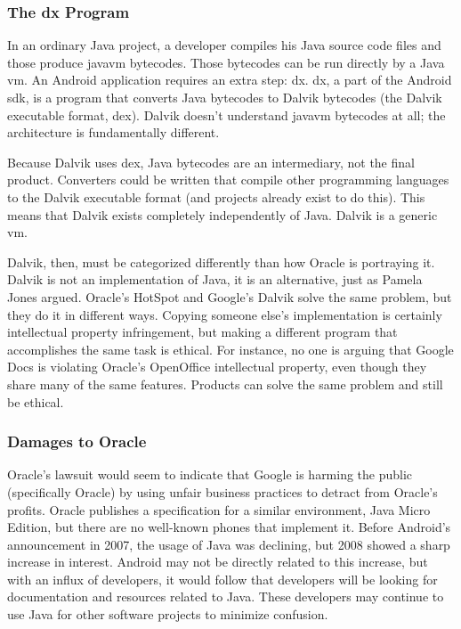 \documentclass[11pt]{article}
\begin{document}
\begin{multicols}{2}
\subsubsection{The dx Program} %
\label{ssub:dex}

In an ordinary Java project, a developer compiles his Java source code files and
those produce \gls{javavm} \glspl{bytecode}.  Those \glspl{bytecode} can be run
directly by a Java \gls{vm}.  An Android application requires an extra step: dx.
dx, a part of the Android \gls{sdk}, is a program that converts Java
\glspl{bytecode} to Dalvik \glspl{bytecode} (the Dalvik executable format, dex).
Dalvik doesn't understand \gls{javavm} \glspl{bytecode} at all; the architecture
is fundamentally different.

Because Dalvik uses dex, Java \glspl{bytecode} are an intermediary, not the
final product.  Converters could be written that compile other programming
languages to the Dalvik executable format (and projects already exist to do
this).  This means that Dalvik exists completely independently of Java.  Dalvik
is a generic \gls{vm}.

Dalvik, then, must be categorized differently than how Oracle is portraying it.
Dalvik is not an implementation of Java, it is an alternative, just as Pamela
Jones argued. \cite{groklaw}  Oracle's HotSpot and Google's Dalvik solve the
same problem, but they do it in different ways.  Copying someone else's
implementation is certainly intellectual property infringement, but making a
different program that accomplishes the same task is ethical.  For instance, no
one is arguing that Google Docs is violating Oracle's OpenOffice intellectual
property, even though they share many of the same features.  Products can solve
the same problem and still be ethical.


\subsubsection{Damages to Oracle} %
\label{ssub:oracle-damage}

Oracle's lawsuit would seem to indicate that Google is harming the public
(specifically Oracle) by using unfair business practices to detract from
Oracle's profits.  Oracle publishes a specification for a similar environment,
Java Micro Edition, but there are no well-known phones that implement it.
Before Android's announcement in 2007, the usage of Java was declining, but 2008
showed a sharp increase in interest.  \cite{tiobe}  Android may not be directly
related to this increase, but with an influx of developers, it would follow that
developers will be looking for documentation and resources related to Java.
These developers may continue to use Java for other software projects to
minimize confusion.


\end{multicols}
\end{document}
